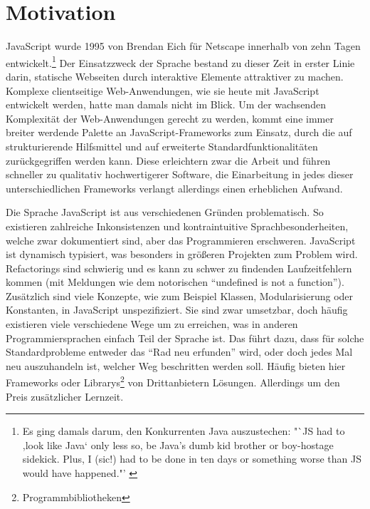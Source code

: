 \documentclass[a4paper, 12pt, hidelinks, listof=totoc, listoftables=totoc, bibliography=totoc]{scrreprt}
\begin{document}
\section{Motivation}

JavaScript wurde 1995 von Brendan Eich für Netscape innerhalb von zehn Tagen entwickelt.\footnote{Es ging damals darum, den Konkurrenten Java auszustechen: "`JS had to ,look like Java` only less so, be Java's dumb kid brother or boy-hostage sidekick. Plus, I (sic!) had to be done in ten days or something worse than JS would have happened."' \cite{eich2010.KBE}}  Der Einsatzzweck der Sprache bestand zu dieser Zeit in erster Linie darin, statische Webseiten durch interaktive Elemente attraktiver zu machen. Komplexe clientseitige Web-Anwendungen, wie sie heute mit JavaScript entwickelt werden, hatte man damals nicht im Blick. Um der wachsenden Komplexität der Web-Anwendungen gerecht zu werden, kommt eine immer breiter werdende Palette an JavaScript-Frameworks zum Einsatz, durch die auf strukturierende Hilfsmittel und auf erweiterte Standardfunktionalitäten zurückgegriffen werden kann. Diese erleichtern zwar die Arbeit und führen schneller zu qualitativ hochwertigerer Software, die Einarbeitung in jedes dieser unterschiedlichen Frameworks verlangt allerdings einen erheblichen Aufwand.

Die Sprache JavaScript ist aus verschiedenen Gründen problematisch. So existieren zahlreiche Inkonsistenzen und kontraintuitive Sprachbesonderheiten, welche zwar dokumentiert sind, aber das Programmieren erschweren. JavaScript ist dynamisch typisiert, was besonders in größeren Projekten zum Problem wird. Refactorings sind schwierig und es kann zu schwer zu findenden Laufzeitfehlern kommen (mit Meldungen wie dem notorischen "`undefined is not a function"'). Zusätzlich sind viele Konzepte, wie zum Beispiel Klassen, Modularisierung oder Konstanten, in JavaScript unspezifiziert. Sie sind zwar umsetzbar, doch häufig existieren viele verschiedene Wege um zu erreichen, was in anderen Programmiersprachen einfach Teil der Sprache ist. 
Das führt dazu, dass für solche Standardprobleme entweder das "`Rad neu erfunden"' wird, oder doch jedes Mal neu auszuhandeln ist, welcher Weg beschritten werden soll. Häufig bieten hier Frameworks oder Librarys\footnote{Programmbibliotheken} von Drittanbietern Lösungen. Allerdings um den Preis zusätzlicher Lernzeit.

\end{document}
